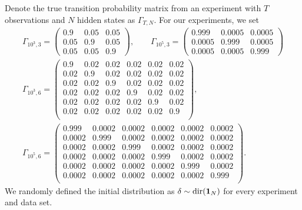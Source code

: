 Denote the true transition probability matrix from an experiment with $T$ observations and $N$ hidden states as $\Gamma_{T,N}$. For our experiments, we set
%
\begin{gather*}
    \Gamma_{10^3,3} = 
    \begin{pmatrix} 
        0.9 & 0.05 & 0.05 \\
        0.05 & 0.9 & 0.05 \\
        0.05 & 0.05 & 0.9
    \end{pmatrix},
    \qquad
    \Gamma_{10^5,3} = 
    \begin{pmatrix} 
        0.999 & 0.0005 & 0.0005 \\
        0.0005 & 0.999 & 0.0005 \\
        0.0005 & 0.0005 & 0.999
    \end{pmatrix}
    \\
    \Gamma_{10^3,6} = 
    \begin{pmatrix} 
        0.9  & 0.02 & 0.02 & 0.02 & 0.02 & 0.02 \\
        0.02 & 0.9  & 0.02 & 0.02 & 0.02 & 0.02 \\
        0.02 & 0.02 & 0.9  & 0.02 & 0.02 & 0.02 \\
        0.02 & 0.02 & 0.02 & 0.9  & 0.02 & 0.02 \\
        0.02 & 0.02 & 0.02 & 0.02 & 0.9  & 0.02 \\
        0.02 & 0.02 & 0.02 & 0.02 & 0.02 & 0.9  \\
    \end{pmatrix},
    \\
    \Gamma_{10^5,6} = 
    \begin{pmatrix} 
        0.999  & 0.0002 & 0.0002 & 0.0002 & 0.0002 & 0.0002 \\
        0.0002 & 0.999  & 0.0002 & 0.0002 & 0.0002 & 0.0002 \\
        0.0002 & 0.0002 & 0.999  & 0.0002 & 0.0002 & 0.0002 \\
        0.0002 & 0.0002 & 0.0002 & 0.999  & 0.0002 & 0.0002 \\
        0.0002 & 0.0002 & 0.0002 & 0.0002 & 0.999  & 0.0002 \\
        0.0002 & 0.0002 & 0.0002 & 0.0002 & 0.0002 & 0.999  \\
    \end{pmatrix}.
\end{gather*}
%
We randomly defined the initial distribution as $\delta \sim \text{dir}(\mathbf{1}_N)$ for every experiment and data set.

